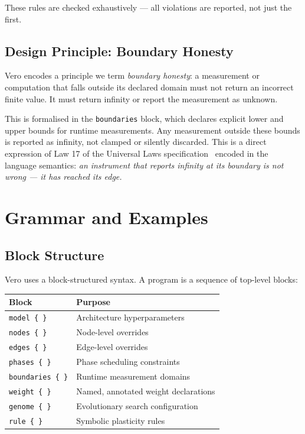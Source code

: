 \documentclass[11pt,a4paper]{article}
\begin{document}
These rules are checked exhaustively --- all violations are reported, not just the first.

\subsection{Design Principle: Boundary Honesty}

Vero encodes a principle we term \emph{boundary honesty}: a measurement or computation that
falls outside its declared domain must not return an incorrect finite value. It must return
infinity or report the measurement as unknown.

This is formalised in the \texttt{boundaries} block, which declares explicit lower and upper
bounds for runtime measurements. Any measurement outside these bounds is reported as
infinity, not clamped or silently discarded. This is a direct expression of Law 17 of the
Universal Laws specification~\cite{ekkerd2026laws} encoded in the language semantics:
\emph{an instrument that reports infinity at its boundary is not wrong --- it has reached its edge.}

\section{Grammar and Examples}
\label{sec:grammar}

\subsection{Block Structure}

Vero uses a block-structured syntax. A program is a sequence of top-level blocks:

\begin{center}
\begin{tabular}{ll}
\toprule
\textbf{Block} & \textbf{Purpose} \\
\midrule
\texttt{model \{ \}}      & Architecture hyperparameters \\
\texttt{nodes \{ \}}      & Node-level overrides \\
\texttt{edges \{ \}}      & Edge-level overrides \\
\texttt{phases \{ \}}     & Phase scheduling constraints \\
\texttt{boundaries \{ \}} & Runtime measurement domains \\
\texttt{weight \{ \}}     & Named, annotated weight declarations \\
\texttt{genome \{ \}}     & Evolutionary search configuration \\
\texttt{rule \{ \}}       & Symbolic plasticity rules \\
\bottomrule
\end{tabular}
\end{center}
\end{document}
